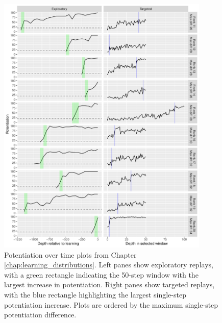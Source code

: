 \begin{figure}[!h]
    \begin{center}
    \includegraphics[width=0.9\textwidth]{07_appendix_potentiation_over_time/media/reps_11_20.pdf}
    \caption{Potentiation over time plots from Chapter \ref{chap:learning_distributions}.
    Left panes show exploratory replays, with a green rectangle indicating the 50-step window with the largest increase in potentiation. 
    Right panes show targeted replays, with the blue rectangle highlighting the largest single-step potentiation increase.
    Plots are ordered by the maximum single-step potentiation difference.}
    \label{fig:app_a_11_20}
    \end{center}
\end{figure}

